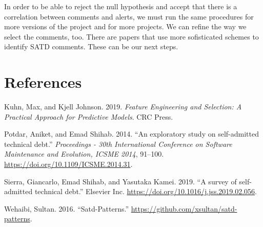 \documentclass[
]{article}
\begin{document}
\normalsize

In order to be able to reject the null hypothesis and accept that there
is a correlation between comments and alerts, we must run the same
procedures for more versions of the project and for more projects. We
can refine the way we select the comments, too. There are papers that
use more sofisticated schemes to identify SATD comments. These can be
our next steps.

\section{References}

\hypertarget{refs}{}
\leavevmode\hypertarget{ref-kuhn2019feature}{}%
Kuhn, Max, and Kjell Johnson. 2019. \emph{Feature Engineering and
Selection: A Practical Approach for Predictive Models}. CRC Press.

\leavevmode\hypertarget{ref-Potdar2014}{}%
Potdar, Aniket, and Emad Shihab. 2014. ``An exploratory study on
self-admitted technical debt.'' \emph{Proceedings - 30th International
Conference on Software Maintenance and Evolution, ICSME 2014}, 91--100.
\url{https://doi.org/10.1109/ICSME.2014.31}.

\leavevmode\hypertarget{ref-Sierra2019}{}%
Sierra, Giancarlo, Emad Shihab, and Yasutaka Kamei. 2019. ``A survey of
self-admitted technical debt.'' Elsevier Inc.
\url{https://doi.org/10.1016/j.jss.2019.02.056}.

\leavevmode\hypertarget{ref-Wehaibi2016}{}%
Wehaibi, Sultan. 2016. ``Satd-Patterns.''
\url{https://github.com/xsultan/satd-patterns}.
\end{document}
